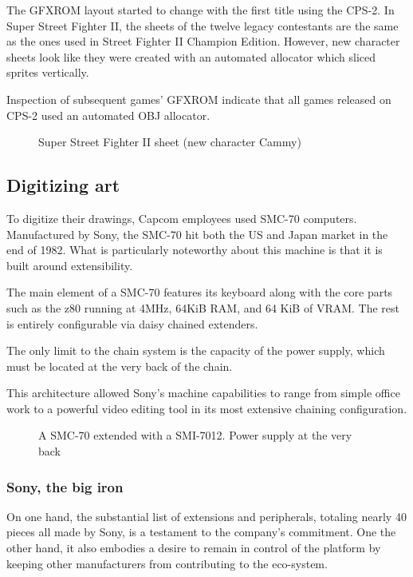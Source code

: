 The GFXROM layout started to change with the first title using the CPS-2. In Super Street Fighter II, the sheets of the twelve legacy contestants are the same as the ones used in Street Fighter II Champion Edition. However, new character sheets look like they were created with an automated allocator which sliced sprites vertically.

Inspection of subsequent games' GFXROM indicate that all games released on CPS-2 used an automated OBJ allocator.

 \begin{figure}[H]
\caption*{Super Street Fighter II sheet (new character Cammy)}
\end{figure}



\subsection{Digitizing art}

To digitize their drawings, Capcom employees used SMC-70 computers. Manufactured by Sony, the SMC-70 hit both the US and Japan market in the end of 1982. What is particularly noteworthy about this machine is that it is built around extensibility. 

The main element of a SMC-70 features its keyboard along with the core parts such as the z80 running at 4MHz, 64KiB RAM, and 64 KiB of VRAM. The rest is entirely configurable via daisy chained extenders. 

The only limit to the chain system is the capacity of the power supply, which must be located at the very back of the chain. 


This architecture allowed Sony's machine capabilities to range from simple office work to a powerful video editing tool in its most extensive chaining configuration. 

\begin{figure}[H]
\caption*{A SMC-70 extended with a SMI-7012. Power supply at the very back}
\end{figure}

\subsubsection{Sony, the big iron}
On one hand, the substantial list of extensions and peripherals, totaling nearly 40 pieces all made by Sony, is a testament to the company's commitment. One the other hand, it also embodies a desire to remain in control of the platform by keeping other manufacturers from contributing to the eco-system.

